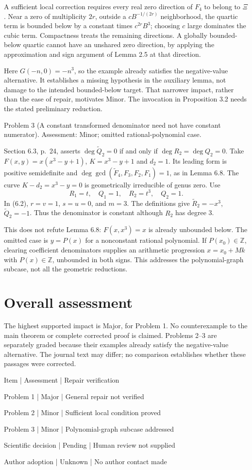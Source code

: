 \documentclass[10pt]{article}
\begin{document}
A sufficient local correction requires every real zero direction of \(F_4\) to belong to \(\Xi\). Near a zero of multiplicity \(2r\), outside a \(cB^{-1/(2r)}\) neighborhood, the quartic term is bounded below by a constant times \(c^{2r}B^3\); choosing \(c\) large dominates the cubic term. Compactness treats the remaining directions. A globally bounded-below quartic cannot have an unshared zero direction, by applying the approximation and sign argument of Lemma 2.5 at that direction.\par
Here \(G(-n,0)=-n^3\), so the example already satisfies the negative-value alternative. It establishes a missing hypothesis in the auxiliary lemma, not damage to the intended bounded-below target. That narrower impact, rather than the ease of repair, motivates Minor. The invocation in Proposition 3.2 needs the stated preliminary reduction.\par
Problem 3 (A constant transformed denominator need not have constant numerator).  Assessment: Minor; omitted rational-polynomial case.\par
Section 6.3, p. 24, asserts \(\deg\widetilde Q_2=0\) if and only if \(\deg R_2=\deg Q_2=0\). Take \(F(x,y)=x(x^3-y+1)\), \(K=x^3-y+1\) and \(d_2=1\). Its leading form is positive semidefinite and \(\deg\gcd(\widetilde F_4,F_3,F_2,F_1)=1\), as in Lemma 6.8. The curve \(K-d_2=x^3-y=0\) is geometrically irreducible of genus zero. Use \[R_1=t,\quad Q_1=1,\quad R_2=t^3,\quad Q_2=1.\] In (6.2), \(r=v=1\), \(s=u=0\), and \(m=3\). The definitions give \(\widetilde R_2=-x^3\), \(\widetilde Q_2=-1\). Thus the denominator is constant although \(R_2\) has degree 3.\par
This does not refute Lemma 6.8: \(F(x,x^3)=x\) is already unbounded below. The omitted case is \(y=P(x)\) for a nonconstant rational polynomial. If \(P(x_0)\in\mathbb Z\), clearing coefficient denominators supplies an arithmetic progression \(x=x_0+Mk\) with \(P(x)\in\mathbb Z\), unbounded in both signs. This addresses the polynomial-graph subcase, not all the geometric reductions.\par
\section*{Overall assessment}
The highest supported impact is Major, for Problem 1. No counterexample to the main theorem or complete corrected proof is claimed. Problems 2–3 are separately graded because their examples already satisfy the negative-value alternative. The journal text may differ; no comparison establishes whether these passages were corrected.\par
Item | Assessment | Repair verification\par
Problem 1 | Major | General repair not verified\par
Problem 2 | Minor | Sufficient local condition proved\par
Problem 3 | Minor | Polynomial-graph subcase addressed\par
Scientific decision | Pending | Human review not supplied\par
Author adoption | Unknown | No author contact made\par
\end{document}

